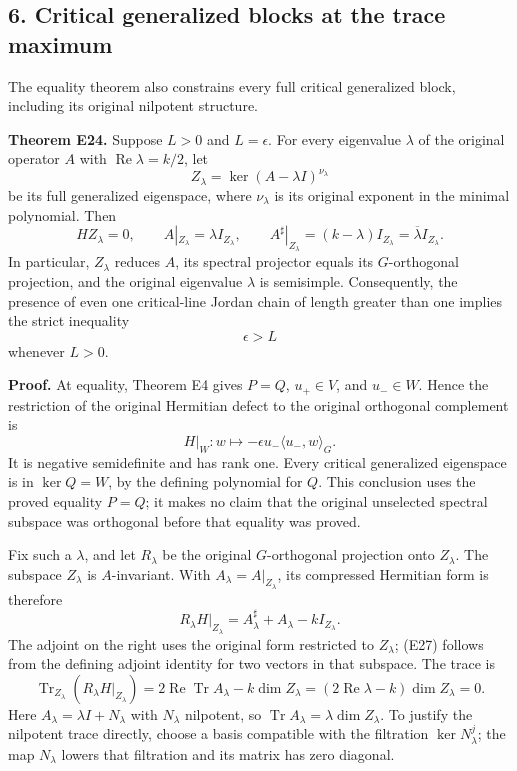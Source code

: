 \subsection{6. Critical generalized blocks at the trace maximum}\label{critical-generalized-blocks-at-the-trace-maximum}

The equality theorem also constrains every full critical generalized block, including its original nilpotent structure.

\textbf{Theorem E24.} Suppose \(L>0\) and \(L=\epsilon\). For every eigenvalue \(\lambda\) of the original operator \(A\) with \(\operatorname{Re}\lambda=k/2\), let
\[
Z_\lambda=\ker(A-\lambda I)^{\nu_\lambda}
\]
be its full generalized eigenspace, where \(\nu_\lambda\) is its original exponent in the minimal polynomial. Then
\[
H Z_\lambda=0,\qquad
A|_{Z_\lambda}=\lambda I_{Z_\lambda},\qquad
A^\sharp|_{Z_\lambda}=(k-\lambda)I_{Z_\lambda}=\overline\lambda I_{Z_\lambda}.
\tag{E24}
\]
In particular, \(Z_\lambda\) reduces \(A\), its spectral projector equals its \(G\)-orthogonal projection, and the original eigenvalue \(\lambda\) is semisimple. Consequently, the presence of even one critical-line Jordan chain of length greater than one implies the strict inequality
\[
\epsilon>L
\tag{E25}
\]
whenever \(L>0\).

\textbf{Proof.} At equality, Theorem E4 gives \(P=Q\), \(u_+\in V\), and \(u_-\in W\). Hence the restriction of the original Hermitian defect to the original orthogonal complement is
\[
H|_W:w\longmapsto-\epsilon u_-\langle u_-,w\rangle_G.
\tag{E26}
\]
It is negative semidefinite and has rank one. Every critical generalized eigenspace is in \(\ker Q=W\), by the defining polynomial for \(Q\). This conclusion uses the proved equality \(P=Q\); it makes no claim that the original unselected spectral subspace was orthogonal before that equality was proved.

Fix such a \(\lambda\), and let \(R_\lambda\) be the original \(G\)-orthogonal projection onto \(Z_\lambda\). The subspace \(Z_\lambda\) is \(A\)-invariant. With \(A_\lambda=A|_{Z_\lambda}\), its compressed Hermitian form is therefore
\[
R_\lambda H|_{Z_\lambda}
=A_\lambda^\sharp+A_\lambda-kI_{Z_\lambda}.
\tag{E27}
\]
The adjoint on the right uses the original form restricted to \(Z_\lambda\); (E27) follows from the defining adjoint identity for two vectors in that subspace. The trace is
\[
\operatorname{Tr}_{Z_\lambda}(R_\lambda H|_{Z_\lambda})
=2\operatorname{Re}\operatorname{Tr}A_\lambda-k\dim Z_\lambda
=(2\operatorname{Re}\lambda-k)\dim Z_\lambda=0.
\tag{E28}
\]
Here \(A_\lambda=\lambda I+N_\lambda\) with \(N_\lambda\) nilpotent, so \(\operatorname{Tr}A_\lambda=\lambda\dim Z_\lambda\). To justify the nilpotent trace directly, choose a basis compatible with the filtration \(\ker N_\lambda^j\); the map \(N_\lambda\) lowers that filtration and its matrix has zero diagonal.

